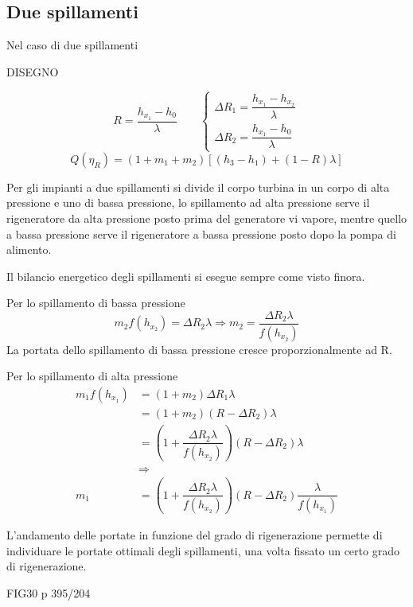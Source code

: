 \subsection{Due spillamenti}
	\begin{adjustwidth}{2in}{}
	
	Nel caso di due spillamenti 
	
	DISEGNO
	
	\[R = \dfrac{h_{x_1}-h_0}{\lambda}\qquad \begin{cases}
	\Delta R_1 = \dfrac{h_{x_1}-h_{x_2}}{\lambda} \\
	\Delta R_2 = \dfrac{h_{x_1}-h_0}{\lambda}
	\end{cases}\]
	\[Q(\eta_R) = (1+m_1+m_2)[(h_3-h_1) + (1-R)\lambda]\]
	
	Per gli impianti a due spillamenti si divide il corpo turbina in un corpo di alta pressione e uno di bassa pressione, lo spillamento ad alta pressione serve il rigeneratore da alta pressione posto prima del generatore vi vapore, mentre quello a bassa pressione serve il rigeneratore a bassa pressione posto dopo la pompa di alimento. \newline
	
	Il bilancio energetico degli spillamenti si esegue sempre come visto finora. 
	
	Per lo spillamento di bassa pressione
	\[m_2f(h_{x_2}) = \Delta R_2\lambda \Rightarrow m_2 = \dfrac{\Delta R_2\lambda}{f(h_{x_2})}\]
	La portata dello spillamento di bassa pressione cresce proporzionalmente ad R.	
	
	Per lo spillamento di alta pressione
	\[\begin{split}
		m_1f(h_{x_1}) & = (1+m_2)\Delta R_1\lambda \\
		& = (1+m_2)(R-\Delta R_2)\lambda \\
		& = \left(1+\dfrac{\Delta R_2\lambda}{f(h_{x_2})}\right)(R-\Delta R_2)\lambda \\
		& \Rightarrow \\
		m_1 & = \left(1+\dfrac{\Delta R_2\lambda}{f(h_{x_2})}\right)(R-\Delta R_2)\dfrac{\lambda}{f(h_{x_1})}
	\end{split}\]
	
	L'andamento delle portate in funzione del grado di rigenerazione permette di individuare le portate ottimali degli spillamenti, una volta fissato un certo grado di rigenerazione. 
	
	FIG30 p 395/204
\end{adjustwidth}

	
